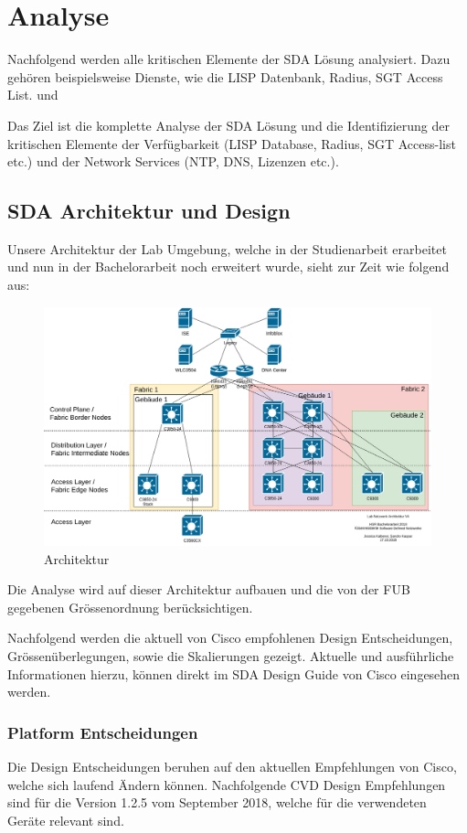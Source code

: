 \section{Analyse}
Nachfolgend werden alle kritischen Elemente der SDA Lösung analysiert. Dazu gehören beispielsweise Dienste, wie die LISP Datenbank, Radius, SGT Access List. und 

Das Ziel ist die komplette Analyse der SDA Lösung und die Identifizierung der kritischen Elemente der Verfügbarkeit (LISP Database, Radius, SGT Access-list etc.) und der Network Services (NTP, DNS, Lizenzen etc.).

\subsection{SDA Architektur und Design}
Unsere Architektur der Lab Umgebung, welche in der Studienarbeit erarbeitet und nun in der Bachelorarbeit noch erweitert wurde, sieht zur Zeit wie folgend aus:

\begin{figure}[H]
	\centering
	\includegraphics[width=1\linewidth]{img/Architecture/LabNetworkArchitecture-17-10}
	\caption{Architektur}
	\label{fig:Architektur}
\end{figure}

Die Analyse wird auf dieser Architektur aufbauen und die von der FUB gegebenen Grössenordnung berücksichtigen.

Nachfolgend werden die aktuell von Cisco empfohlenen Design Entscheidungen, Grössenüberlegungen, sowie die Skalierungen gezeigt. Aktuelle und ausführliche Informationen hierzu, können direkt im SDA Design Guide von Cisco \cite{sda-designguide-sept2018} eingesehen werden. 

\subsubsection{Platform Entscheidungen}
Die Design Entscheidungen beruhen auf den aktuellen Empfehlungen von Cisco, welche sich laufend Ändern können. Nachfolgende CVD Design Empfehlungen sind für die Version 1.2.5 vom September 2018, welche für die verwendeten Geräte relevant sind. 

